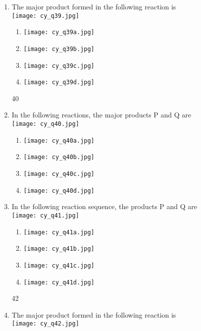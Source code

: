 \documentclass[12pt]{article}
\begin{document}
\begin{enumerate}[label=Q.\arabic*]
							\item The major product formed in the following reaction is\\[1ex]
							\texttt{[image: cy\_q39.jpg]}

							\vspace{1ex}
							\begin{multicols}{2}
							\begin{enumerate}[label=(\Alph*)]
							\item \texttt{[image: cy\_q39a.jpg]}
							\item \texttt{[image: cy\_q39b.jpg]}
							\item \texttt{[image: cy\_q39c.jpg]}
							\item \texttt{[image: cy\_q39d.jpg]}
							\end{enumerate}
							\end{multicols}
							40
							\item In the following reactions, the major products P and Q are\\[1ex]
							\texttt{[image: cy\_q40.jpg]}

							\vspace{1ex}
							\begin{multicols}{2}
							\begin{enumerate}[label=(\Alph*)]
							\item \texttt{[image: cy\_q40a.jpg]}
							\item \texttt{[image: cy\_q40b.jpg]}
							\item \texttt{[image: cy\_q40c.jpg]}
							\item \texttt{[image: cy\_q40d.jpg]}
							\end{enumerate}
							\end{multicols}

							\item In the following reaction sequence, the products P and Q are\\[1ex]
							\texttt{[image: cy\_q41.jpg]}

							\vspace{1ex}
							\begin{multicols}{2}
							\begin{enumerate}[label=(\Alph*)]
							\item \texttt{[image: cy\_q41a.jpg]}
							\item \texttt{[image: cy\_q41b.jpg]}
							\item \texttt{[image: cy\_q41c.jpg]}
							\item \texttt{[image: cy\_q41d.jpg]}
							\end{enumerate}
							\end{multicols}
							42
							\item The major product formed in the following reaction is\\[1ex]
							\texttt{[image: cy\_q42.jpg]}


\end{enumerate}
\end{document}
